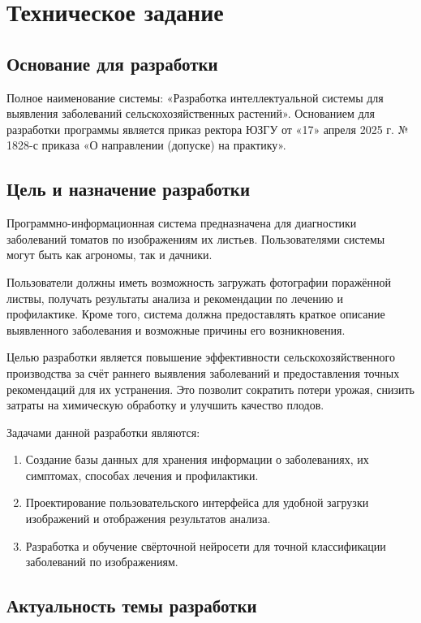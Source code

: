 \section{Техническое задание}
\subsection{Основание для разработки}

Полное наименование системы: «Разработка интеллектуальной системы для выявления заболеваний сельскохозяйственных растений». Основанием для разработки программы является приказ ректора ЮЗГУ от «17» апреля 2025 г. № 1828-с приказа «О направлении (допуске) на практику». %

\subsection{Цель и назначение разработки}

Программно-информационная система предназначена для диагностики заболеваний томатов по изображениям их листьев. Пользователями системы могут быть как агрономы, так и дачники.

Пользователи должны иметь возможность загружать фотографии поражённой листвы, получать результаты анализа и рекомендации по лечению и профилактике. Кроме того, система должна предоставлять краткое описание выявленного заболевания и возможные причины его возникновения.

Целью разработки является повышение эффективности сельскохозяйственного производства за счёт раннего выявления заболеваний и предоставления точных рекомендаций для их устранения. Это позволит сократить потери урожая, снизить затраты на химическую обработку и улучшить качество плодов.

Задачами данной разработки являются:
\begin{enumerate}
	\item Создание базы данных для хранения информации о заболеваниях, их симптомах, способах лечения и профилактики.
	\item Проектирование пользовательского интерфейса для удобной загрузки изображений и отображения результатов анализа.
	\item Разработка и обучение свёрточной нейросети для точной классификации заболеваний по изображениям.
\end{enumerate}

\subsection{Актуальность темы разработки}


